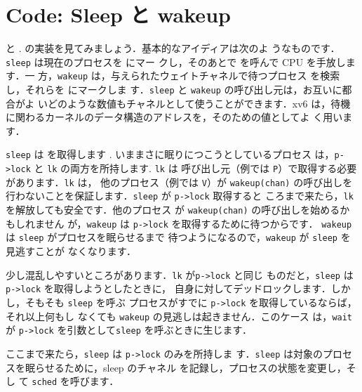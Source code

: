 \section{Code: Sleep と wakeup}

と 
.
の実装を見てみましょう．基本的なアイディアは次のよ
うなものです．\lstinline{sleep} は現在のプロセスを  にマー
クし，そのあとで  を呼んで CPU を手放します．一
方，\lstinline{wakeup} は，与えられたウェイトチャネルで待つプロセス
を検索し，それらを  にマークしま
す．\lstinline{sleep} と \lstinline{wakeup} の呼び出し元は，お互いに都合がよ
いどのような数値もチャネルとして使うことができます．xv6
は，待機に関わるカーネルのデータ構造のアドレスを，そのための値としてよ
く用います．

\lstinline{sleep} は  を取得します
. 
いままさに眠りにつこうとしているプロセス
は，\lstinline{p->lock} と \lstinline{lk} の両方を所持します. \lstinline{lk} は
呼び出し元（例では \lstinline{P}）で取得する必要があります．\lstinline{lk} は，
他のプロセス（例では \lstinline{V}）が \lstinline{wakeup(chan)} の呼び出しを
行わないことを保証します．\lstinline{sleep} が \lstinline{p->lock} 取得すると
ころまで来たら，\lstinline{lk} を解放しても安全です．他のプロセス
が \lstinline{wakeup(chan)} の呼び出しを始めるかもしれません
が，\lstinline{wakeup} は \lstinline{p->lock} を取得するために待つからです．
\lstinline{wakeup} は \lstinline{sleep} がプロセスを眠らせるまで
待つようになるので，\lstinline{wakeup} が \lstinline{sleep} を見逃すことが
なくなります．

少し混乱しやすいところがあります．\lstinline{lk} が\lstinline{p->lock} と同じ
ものだと，\lstinline{sleep} は \lstinline{p->lock} を取得しようとしたときに，
自身に対してデッドロックします．しかし，そもそも \lstinline{sleep} を呼ぶ
プロセスがすでに \lstinline{p->lock} を取得しているならば，それ以上何もし
なくても \lstinline{wakeup} の見逃しは起きません．このケース
は，\lstinline{wait}
が \lstinline{p->lock} を引数として\lstinline{sleep} を呼ぶときに生じます．

ここまで来たら，\texttt{sleep} は \texttt{p->lock} のみを所持しま
す．\texttt{sleep} は対象のプロセスを眠らせるために，sleep のチャネル
を記録し，プロセスの状態を変更し，そし
て \texttt{sched}  を呼びます．

